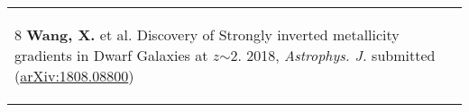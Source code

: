 \documentclass[letterpaper,10pt]{article}
\newcommand{\narrow}{-1.8ex}
\begin{document}
\begin{longtable}{p{6in}}
\begin{list}{}{\leftmargin=0.5em}
    \item[8]\hypertarget{18.wang.apj}{} \textbf{Wang, X.} et al. Discovery of Strongly inverted metallicity gradients in Dwarf Galaxies at $z$$\sim$2. 2018, \textit{Astrophys. J.} submitted (\href{https://arxiv.org/abs/1808.08800}{arXiv:1808.08800})
\end{list}  \\[\narrow]


\end{longtable}
\end{document}
